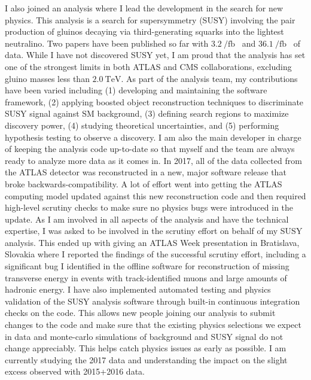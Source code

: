 \documentclass[letterpaper, 10pt]{article}
\begin{document}
I also joined an analysis where I lead the development in the search for new physics. This analysis is a search for supersymmetry (SUSY) involving the pair production of gluinos decaying via third-generating squarks into the lightest neutralino. Two papers have been published so far with $\SI{3.2}{\per\femto\barn}$~ and $\SI{36.1}{\per\femto\barn}$~ of data. While I have not discovered SUSY yet, I am proud that the analysis has set one of the strongest limits in both ATLAS and CMS collaborations, excluding gluino masses less than $\SI{2.0}{\tera\electronvolt}$. As part of the analysis team, my contributions have been varied including (1) developing and maintaining the software framework, (2) applying boosted object reconstruction techniques to discriminate SUSY signal against SM background, (3) defining search regions to maximize discovery power, (4) studying theoretical uncertainties, and (5) performing hypothesis testing to observe a discovery. I am also the main developer in charge of keeping the analysis code up-to-date so that myself and the team are always ready to analyze more data as it comes in. In 2017, all of the data collected from the ATLAS detector was reconstructed in a new, major software release that broke backwards-compatibility. A lot of effort went into getting the ATLAS computing model updated against this new reconstruction code and then required high-level scrutiny checks to make sure no physics bugs were introduced in the update. As I am involved in all aspects of the analysis and have the technical expertise, I was asked to be involved in the scrutiny effort on behalf of my SUSY analysis. This ended up with giving an ATLAS Week presentation in Bratislava, Slovakia where I reported the findings of the successful scrutiny effort, including a significant bug I identified in the offline software for reconstruction of missing transverse energy in events with track-identified muons and large amounts of hadronic energy. I have also implemented automated testing and physics validation of the SUSY analysis software through built-in continuous integration checks on the code. This allows new people joining our analysis to submit changes to the code and make sure that the existing physics selections we expect in data and monte-carlo simulations of background and SUSY signal do not change appreciably. This helps catch physics issues as early as possible. I am currently studying the 2017 data and understanding the impact on the slight excess observed with 2015+2016 data.
\end{document}
